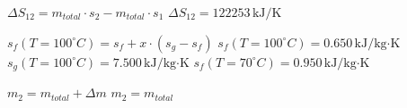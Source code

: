 \( \Delta S_{12} = m_{total} \cdot s_2 - m_{total} \cdot s_1 \)  
\( \Delta S_{12} = 122253 \, \text{kJ/K} \)  

\( s_f(T = 100^\circ C) = s_f + x \cdot (s_g - s_f) \)  
\( s_f(T = 100^\circ C) = 0.650 \, \text{kJ/kg·K} \)  
\( s_g(T = 100^\circ C) = 7.500 \, \text{kJ/kg·K} \)  
\( s_f(T = 70^\circ C) = 0.950 \, \text{kJ/kg·K} \)  

\( m_2 = m_{total} + \Delta m \)  
\( m_2 = m_{total} \)